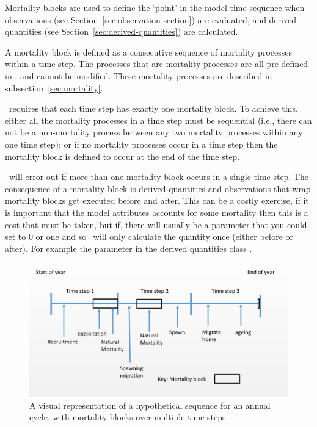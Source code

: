 Mortality blocks are used to define the `point' in the model time sequence when observations (see Section~\ref{sec:observation-section}) are evaluated, and derived quantities (see Section~\ref{sec:derived-quantities}) are calculated.

A mortality block is defined as a consecutive sequence of mortality processes within a time step. The processes that are mortality processes are all pre-defined in \IBM, and cannot be modified. These mortality processes are described in subsection~\ref{sec:mortality}. 

\IBM\ requires that each time step has exactly one mortality block. To achieve this, either all the mortality processes in a time step must be sequential (i.e., there can not be a non-mortality process between any two mortality processes within any one time step); or if no mortality processes occur in a time step then the mortality block is defined to occur at the end of the time step. 

\IBM\ will error out if more than one mortality block occurs in a single time step. The consequence of a mortality block is derived quantities and observations that wrap mortality blocks get executed before and after. This can be a costly exercise, if it is important that the model attributes accounts for some mortality then this is a cost that must be taken, but if, there will usually be a parameter that you could set to 0 or one and so \IBM\ will only calculate the quantity once (either before or after). For example the parameter in the derived quantities class .

\begin{figure}[H]
	\centering
	\includegraphics[scale=0.5]{Figures/annual_cycle.jpg}
	\caption{A visual representation of a hypothetical sequence for an annual cycle, with mortality blocks over multiple time steps.}\label{Fig:annual}
\end{figure}

